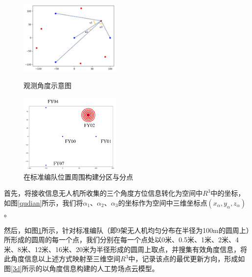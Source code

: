 \documentclass{my_paper}
\begin{document}
\begin{figure}[htbp]
    \centering
    \begin{minipage}[t]{0.48\textwidth}
        \centering
        \includegraphics[width=5cm]{images/qudian.jpg}
        \caption{观测角度示意图}
        \label{qudian}
    \end{minipage}
    \begin{minipage}[t]{0.48\textwidth}
        \centering
        \includegraphics[width=5cm]{images/fenqu.png}
        \caption{在标准编队位置周围构建分区与分点}
        \label{fenqu}
    \end{minipage}
\end{figure}


首先，将接收信息无人机所收集的三个角度方位信息转化为空间中$R^3$中的坐标，如图\ref{qudian}所示，我们将$\alpha_1$、$\alpha_2$、$\alpha_3$的坐标作为空间中三维坐标点$(x_{\alpha},y_{\alpha},z_{\alpha})$。

然后，如图\ref{fenqu}所示，针对标准编队（即9架无人机均匀分布在半径为100m的圆周上）所形成的圆周的每一个点，我们分别在每一个点处以0米、0.5米、1米、2米、4米、8米、12米、16米、20米为半径形成的圆周上取点，并搜集有效角度信息，将此角度信息以上述方式映射至三维空间$R^{3}$中，记录该点的最优更新方向，形成如图\ref{3d}所示的以角度信息构建的人工势场点云模型。
\end{document}
